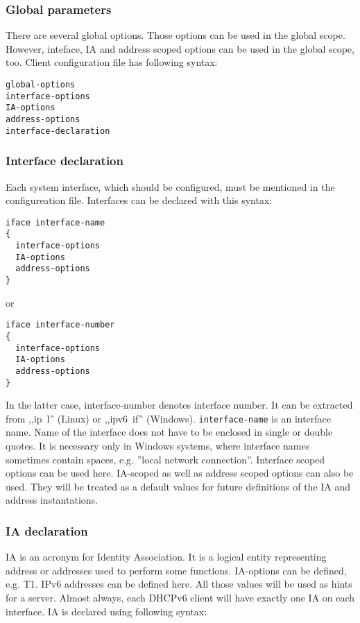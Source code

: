 \subsubsection{Global parameters}

There are several global options. Those options can be used in the
global scope. However, inteface, IA and address scoped options can be
used in the global scope, too. 
Client configuration file has following syntax:

\begin{verbatim}
global-options
interface-options
IA-options
address-options
interface-declaration
\end{verbatim}

\subsubsection{Interface declaration}

Each system interface, which should be configured, must be mentioned in
the configureation file. Interfaces can be declared with this syntax:
\begin{verbatim}
iface interface-name
{
  interface-options
  IA-options
  address-options        
}
\end{verbatim}

or 

\begin{verbatim}
iface interface-number 
{
  interface-options
  IA-options
  address-options        
}
\end{verbatim}

In the latter case, interface-number denotes interface number. It can be extracted
from ,,ip~l'' (Linux) or
,,ipv6~if'' (Windows). \verb+interface-name+ is an interface
name.  Name of the interface does not have to be enclosed in single or
double quotes. It is necessary only in Windows systems, where interface
names sometimes contain spaces, e.g. ''local network connection''.
Interface scoped options can be used here. IA-scoped as well as address
scoped options can also be used. They will be treated as a default
values for future definitions of the IA and address instantations.

\subsubsection{IA declaration}
IA is an acronym for Identity Association. It is a logical entity
representing address or addresses used to perform some
functions. IA-options can be defined, e.g. T1. IPv6 addresses can be
defined here. All those values will be used as hints for a server.
Almost always, each DHCPv6 client will have exactly one IA on each
interface. IA is declared using following syntax:

